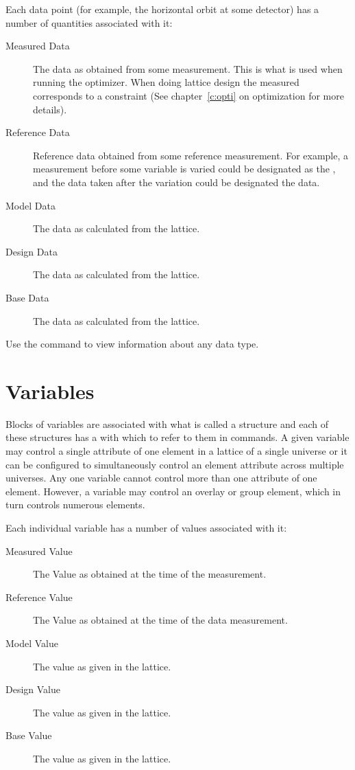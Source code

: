 Each data point (for example, the horizontal orbit at some
detector) has a number of quantities associated with it:
  \vspace*{-3ex}
  \begin{description}
  \item[Measured Data] \Newline 
The data as obtained from some measurement. This is what is used when
running the optimizer.  When doing lattice design the measured
 corresponds to a constraint (See chapter~\ref{c:opti} on
optimization for more details).
  \item[Reference Data] \Newline
Reference data obtained from some reference measurement. For example,
a measurement before some variable is varied could be designated as
the , and the data taken after the variation could be 
designated the  data.
  \item[Model Data] \Newline
The data as calculated from the  lattice.
  \item[Design Data] \Newline
The data as calculated from the  lattice.
  \item[Base Data] \Newline
The data as calculated from the  lattice.
  \end{description}

Use the  command to view information about any data type.

\vfill
\break
\section{Variables}

Blocks of variables are associated with what is called a 
structure and each of these structures has a  with which to
refer to them in \tao commands. A given variable may control a single
attribute of one element in a  lattice of a single universe
or it can be configured to simultaneously control an element attribute
across multiple universes. Any one variable cannot control more than
one attribute of one element. However, a variable may control an
overlay or group element, which in turn controls numerous elements.

Each individual variable has a number of values associated with it:
  \vspace*{-3ex}
  \begin{description}
  \item[Measured Value] \Newline
The Value as obtained at the time of the  measurement.
  \item[Reference Value] \Newline
The Value as obtained at the time of the  data  measurement.
  \item[Model Value] \Newline
The value as given in the  lattice.
  \item[Design Value] \Newline
The value as given in the  lattice.
  \item[Base Value] \Newline
The value as given in the  lattice.
  \end{description}

